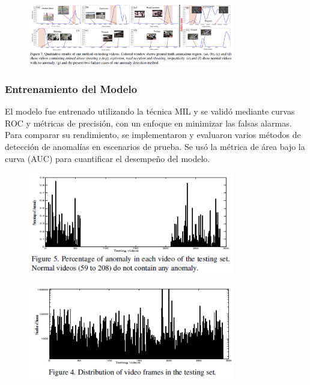 \begin{figure}[h] %
    \centering
    \includegraphics[width=0.8\textwidth]{4/pro5.1.png} %
    \label{fig:ejemplo} %
\end{figure}


\subsubsection{Entrenamiento del Modelo}
El modelo fue entrenado utilizando la técnica MIL y se validó mediante curvas ROC y métricas de precisión, con un enfoque en minimizar las falsas alarmas. Para comparar su rendimiento, se implementaron y evaluaron varios métodos de detección de anomalías en escenarios de prueba. Se usó la métrica de área bajo la curva (AUC) para cuantificar el desempeño del modelo.

\begin{figure}[h] %
    \centering
    \includegraphics[width=0.8\textwidth]{4/ent5.png} %
    \label{fig:ejemplo} %
\end{figure}

\begin{figure}[h] %
    \centering
    \includegraphics[width=0.8\textwidth]{4/ent5.1.png} %
    \label{fig:ejemplo} %
\end{figure}

